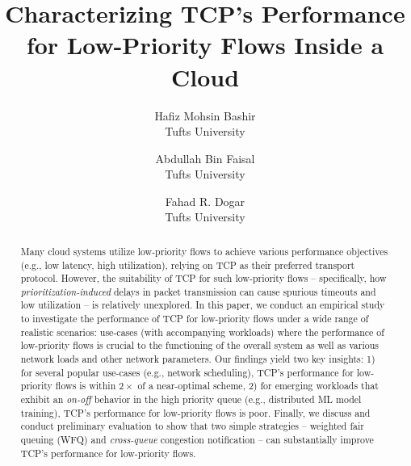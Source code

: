 \documentclass[letterpaper,twocolumn,10pt]{article}
\begin{document}
\title{Characterizing TCP's Performance for Low-Priority Flows Inside a Cloud}
\author{
{\rm Hafiz Mohsin Bashir}\\
Tufts University
\and
{\rm Abdullah Bin Faisal}\\
Tufts University
\and
{\rm Fahad R. Dogar}\\
Tufts University
}
\maketitle
\begin{abstract}
Many cloud systems utilize low-priority flows to achieve various performance objectives (e.g., low latency, high utilization), relying on TCP as their preferred transport protocol. However, the suitability of TCP for such low-priority flows -- specifically, how \emph{prioritization-induced} delays in packet transmission can cause spurious timeouts and low utilization -- is relatively unexplored.  In this paper, we conduct an empirical study to investigate the performance of TCP for low-priority flows under a wide range of realistic scenarios: use-cases (with accompanying workloads) where the performance of low-priority flows is crucial to the functioning of the overall system as well as various network loads and other network parameters. Our findings yield two key insights: 1) for several popular use-cases (e.g., network scheduling), TCP's performance for low-priority flows is within $2\times$ of a near-optimal scheme, 2) for emerging workloads that exhibit an \emph{on-off} behavior in the high priority queue (e.g., distributed ML model training), TCP's performance for low-priority flows is poor. Finally, we discuss and conduct preliminary evaluation to show that two simple strategies -- weighted fair queuing (WFQ) and \emph{cross-queue} congestion notification -- can substantially improve TCP's performance for low-priority flows. 
\end{abstract}







\newpage


\end{document}
